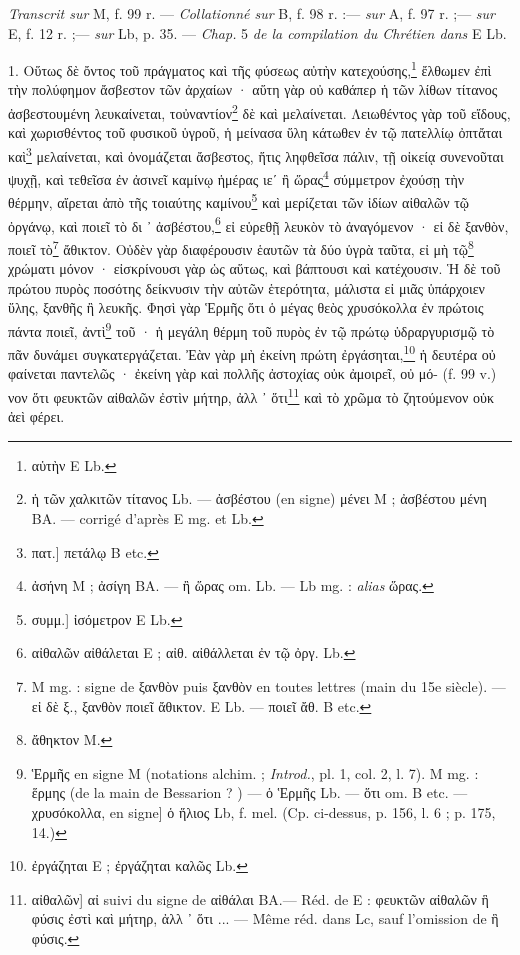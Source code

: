 \documentclass[a4paper, 11pt, oneside, polutonikogreek, french]{article}
\begin{document}
\emph{Transcrit sur} M, f. 99 r. --- \emph{Collationné sur} B, f. 98 r. :--- \emph{sur} A, f. 97 r. ;--- \emph{sur} E, f. 12 r. ;--- \emph{sur} Lb, p. 35. --- \emph{Chap.} 5 \emph{de la compilation du Chrétien dans} E Lb.

1. Οὕτως δὲ ὄντος τοῦ πράγματος καὶ τῆς φύσεως αὐτὴν κατεχούσης,\footnote{αὑτὴν E Lb.} ἔλθωμεν ἐπὶ τὴν πολύφημον ἄσβεστον τῶν ἀρχαίων · αὕτη γὰρ οὐ καθάπερ ἡ τῶν λίθων τίτανος ἀσβεστουμένη λευκαίνεται, τοὐναντίον\footnote{ἡ τῶν χαλκιτῶν τίτανος Lb. --- ἀσβέστου (en signe) μένει M ; ἀσβέστου μένη BA. --- corrigé d'après E mg. et Lb.} δὲ καὶ μελαίνεται. Λειωθέντος γὰρ τοῦ εἴδους, καὶ χωρισθέντος τοῦ φυσικοῦ ὑγροῦ, ἡ μείνασα ὕλη κάτωθεν ἐν τῷ πατελλίῳ ὀπτἄται καὶ\footnote{πατ.] πετάλῳ B etc.} μελαίνεται, καὶ ὀνομάζεται ἄσβεστος, ἥτις ληφθεῖσα πάλιν, τῇ οἰκείᾳ συνενοῦται ψυχῇ, καὶ τεθεῖσα ἐν ἀσινεῖ καμίνῳ ἡμέρας ιεʹ ἢ ὥρας\footnote{ἀσήνη M ; ἀσίγη BA. --- ἢ ὥρας om. Lb. --- Lb mg. : \emph{alias} ὥρας.} σύμμετρον ἐχούσῃ τὴν θέρμην, αἴρεται ἀπὸ τῆς τοιαύτης καμίνου\footnote{συμμ.] ἰσόμετρον E Lb.} καὶ μερίζεται τῶν ἰδίων αἰθαλῶν τῷ ὀργάνῳ, καὶ ποιεῖ τὸ δι ᾽ ἀσβέστου,\footnote{αἰθαλῶν αἰθάλεται E ; αἰθ. αἰθάλλεται ἐν τῷ ὀργ. Lb.} εἰ εὑρεθῇ λευκὸν τὸ ἀναγόμενον · εἰ δὲ ξανθὸν, ποιεῖ τὸ\footnote{M mg. : signe de ξανθὸν puis ξανθὸν en toutes lettres (main du 15e siècle). --- εἰ δὲ ξ., ξανθὸν ποιεῖ ἄθικτον. E Lb. --- ποιεῖ ἄθ. B etc.} ἄθικτον. Οὐδὲν γὰρ διαφέρουσιν ἑαυτῶν τὰ δύο ὑγρὰ ταῦτα, εἰ μὴ τῷ\footnote{ἄθηκτον M.} χρώματι μόνον · εἰσκρίνουσι γὰρ ὡς αὕτως, καὶ βάπτουσι καὶ κατέχουσιν. Ἡ δὲ τοῦ πρώτου πυρὸς ποσότης δείκνυσιν τὴν αὐτῶν ἑτερότητα, μάλιστα εἰ μιᾶς ὑπάρχοιεν ὕλης, ξανθῆς ἢ λευκῆς. Φησὶ γὰρ Ἑρμῆς ὅτι ὁ μέγας θεὸς χρυσόκολλα ἐν πρώτοις πάντα ποιεῖ, ἀντὶ\footnote{Ἑρμῆς en signe M (notations alchim. ; \emph{Introd.}, pl. 1, col. 2, l. 7). M mg. : ἕρμης (de la main de Bessarion ? ) --- ὁ Ἑρμῆς Lb. --- ὅτι om. B etc. --- χρυσόκολλα, en signe] ὁ ἥλιος Lb, f. mel. (Cp. ci-dessus, p. 156, l. 6 ; p. 175, 14.)} τοῦ · ἡ μεγάλη θέρμη τοῦ πυρὸς ἐν τῷ πρώτῳ ὑδραργυρισμῷ τὸ πᾶν δυνάμει συγκατεργάζεται. Ἐὰν γὰρ μὴ ἐκείνη πρώτη ἐργάσηται,\footnote{ἐργάζηται E ; ἐργάζηται καλῶς Lb.} ἡ δευτέρα οὐ φαίνεται παντελῶς · ἐκείνη γὰρ καὶ πολλῆς ἀστοχίας οὐκ ἀμοιρεῖ, οὐ μό- (f. 99 v.) νον ὅτι φευκτῶν αἰθαλῶν ἐστὶν μήτηρ, ἀλλ ᾽ ὅτι\footnote{αἰθαλῶν] αἰ suivi du signe de αἰθάλαι BA.--- Réd. de E : φευκτῶν αἰθαλῶν ἣ φύσις ἐστὶ καὶ μήτηρ, ἀλλ ᾽ ὅτι ... --- Même réd. dans Lc, sauf l'omission de ἣ φύσις.} καὶ τὸ χρῶμα τὸ ζητούμενον οὐκ ἀεὶ φέρει.

\bigskip
\centerline{\EightStarTaper}
\centerline{\EightStarTaper\EightStarTaper}
\bigskip
\end{document}
